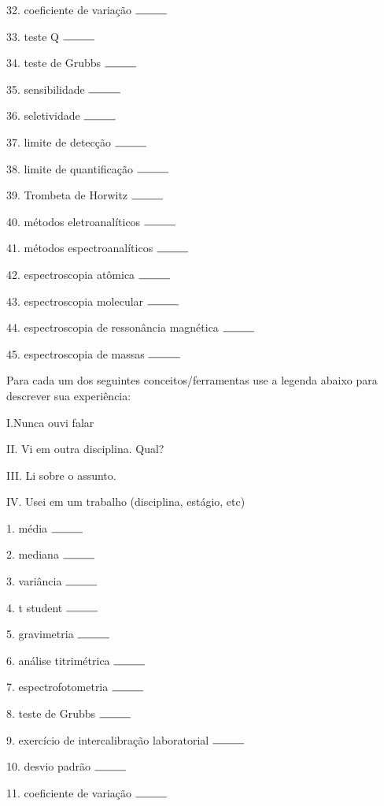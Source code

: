 \documentclass[a4paper,10pt]{article}
\begin{document}
\begin{multicols}{2}
32. coeficiente de variação $\rule{1cm}{0.15mm}$

33. teste Q $\rule{1cm}{0.15mm}$

34. teste de Grubbs $\rule{1cm}{0.15mm}$

35. sensibilidade $\rule{1cm}{0.15mm}$

36. seletividade $\rule{1cm}{0.15mm}$

37. limite de detecção $\rule{1cm}{0.15mm}$

38. limite de quantificação $\rule{1cm}{0.15mm}$

39. Trombeta de Horwitz $\rule{1cm}{0.15mm}$

40. métodos eletroanalíticos $\rule{1cm}{0.15mm}$

41. métodos espectroanalíticos $\rule{1cm}{0.15mm}$

42. espectroscopia atômica $\rule{1cm}{0.15mm}$

43. espectroscopia molecular $\rule{1cm}{0.15mm}$

44. espectroscopia de ressonância magnética $\rule{1cm}{0.15mm}$

45. espectroscopia de massas $\rule{1cm}{0.15mm}$

\end{multicols}

Para cada um dos seguintes conceitos/ferramentas use a legenda abaixo para descrever sua experiência:

I.Nunca ouvi falar

II. Vi em outra disciplina. Qual?

III. Li sobre o assunto.

IV. Usei em um trabalho (disciplina, estágio, etc)

1. média $\rule{1cm}{0.15mm}$

2. mediana $\rule{1cm}{0.15mm}$

3. variância $\rule{1cm}{0.15mm}$

4. t student $\rule{1cm}{0.15mm}$

5. gravimetria $\rule{1cm}{0.15mm}$

6. análise titrimétrica $\rule{1cm}{0.15mm}$

7. espectrofotometria $\rule{1cm}{0.15mm}$

8. teste de Grubbs $\rule{1cm}{0.15mm}$

9. exercício de intercalibração laboratorial $\rule{1cm}{0.15mm}$

10. desvio padrão $\rule{1cm}{0.15mm}$

11. coeficiente de variação $\rule{1cm}{0.15mm}$


\end{document}
